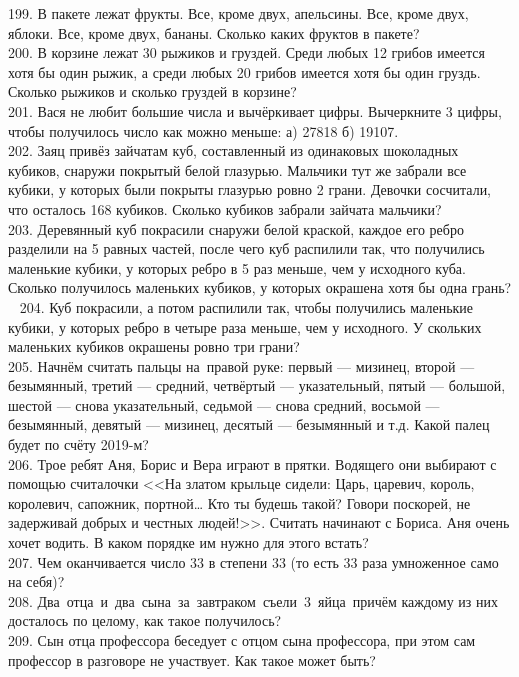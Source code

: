 199. В пакете лежат фрукты. Все, кроме двух, апельсины. Все, кроме двух, яблоки. Все, кроме двух, бананы. Сколько каких фруктов в пакете?\\
200. В корзине лежат 30 рыжиков и груздей. Среди любых 12 грибов имеется хотя бы один рыжик, а среди любых 20 грибов имеется хотя бы один груздь. Сколько рыжиков и сколько груздей в корзине?\\
201. Вася не любит большие числа и вычёркивает цифры. Вычеркните 3 цифры, чтобы получилось число как можно меньше: а) 27818 б) 19107.\\
202. Заяц привёз зайчатам куб, составленный из одинаковых шоколадных кубиков, снаружи покрытый белой глазурью. Мальчики тут же забрали все кубики, у которых были покрыты глазурью ровно 2 грани. Девочки сосчитали, что осталось 168 кубиков. Сколько кубиков забрали зайчата мальчики?\\
203. Деревянный куб покрасили снаружи белой краской, каждое его ребро разделили на 5 равных частей, после чего куб распилили так, что получились маленькие кубики, у которых ребро в 5 раз меньше, чем у исходного куба. Сколько получилось маленьких кубиков, у которых окрашена хотя бы одна грань?\\ 
204. Куб покрасили, а потом распилили так, чтобы получились маленькие кубики, у которых ребро в четыре раза меньше, чем у исходного. У скольких маленьких кубиков окрашены ровно три грани?\\
205. Начнём считать пальцы на правой руке: первый --- мизинец, второй --- безымянный, третий --- средний, четвёртый --- указательный, пятый --- большой, шестой --- снова указательный, седьмой --- снова средний, восьмой --- безымянный, девятый --- мизинец, десятый --- безымянный и т.д. Какой палец будет по счёту 2019-м?\\
206. Трое ребят Аня, Борис и Вера играют в прятки. Водящего они выбирают с помощью считалочки <<На златом крыльце сидели: Царь, царевич, король, королевич, сапожник, портной… Кто ты будешь такой? Говори поскорей, не задерживай добрых и честных людей!>>. Считать начинают с Бориса. Аня очень хочет водить.  В каком порядке им нужно для этого встать?\\
207. Чем оканчивается число 33 в степени 33 (то есть 33 раза умноженное само на себя)?\\
208. Два отца и два сына за завтраком съели 3 яйца причём каждому из них досталось по целому, как такое получилось?\\
209. Сын отца профессора беседует с отцом сына профессора, при этом сам профессор в разговоре не участвует. Как такое может быть?\\
